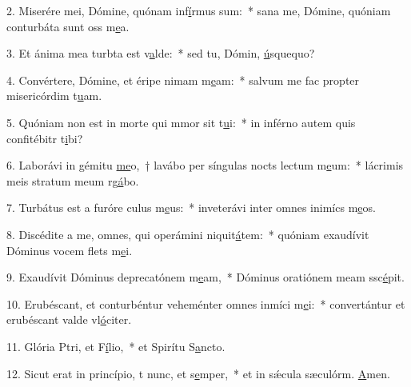 2. Miserére mei, Dómine, quónam inf\uline{í}rmus sum:~* sana me, Dómine, quóniam conturbáta sunt oss m\uline{e}a.\par 
3. Et ánima mea turbta est v\uline{a}lde:~* sed tu, Dómin, \uline{ú}squequo?\par 
4. Convértere, Dómine, et éripe nimam m\uline{e}am:~* salvum me fac propter misericórdim t\uline{u}am.\par 
5. Quóniam non est in morte qui mmor sit t\uline{u}i:~* in inférno autem quis confitébitr t\uline{i}bi?\par 
6. Laborávi in gémitu \uline{me}o,~† lavábo per síngulas nocts lectum m\uline{e}um:~* lácrimis meis stratum meum rg\uline{á}bo.\par 
7. Turbátus est a furóre culus m\uline{e}us:~* inveterávi inter omnes inimícs m\uline{e}os.\par 
8. Discédite a me, omnes, qui operámini niquit\uline{á}tem:~* quóniam exaudívit Dóminus vocem flets m\uline{e}i.\par 
9. Exaudívit Dóminus deprecatónem m\uline{e}am,~* Dóminus oratiónem meam ssc\uline{é}pit.\par 
10. Erubéscant, et conturbéntur veheménter omnes inmíci m\uline{e}i:~* convertántur et erubéscant valde vl\uline{ó}citer.\par 
11. Glória Ptri, et F\uline{í}lio,~* et Spirítu S\uline{a}ncto.\par 
12. Sicut erat in princípio, t nunc, et s\uline{e}mper,~* et in sǽcula sæculórm. \uline{A}men.\par 

